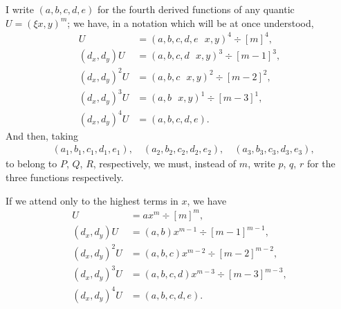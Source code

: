 \documentclass[12pt,a4paper]{article}
\theoremstyle{cayley}
\theoremstyle{definition}
\numberwithin{equation}{section}
\begin{document}
I write $(a, b, c, d, e)$ for the fourth derived functions of any quantic $U = (\xi x, y)^m$; we have, in a notation which will be at once understood,
\begin{align*}
U &= (a, b, c, d, e \,\,\,\, x, y)^4 \div [m]^4, \\
(d_x, d_y)U &= (a, b, c, d \,\,\,\, x, y)^3 \div [m-1]^3, \\
(d_x, d_y)^2 U &= (a, b, c \,\,\,\, x, y)^2 \div [m-2]^2, \\
(d_x, d_y)^3 U &= (a, b \,\,\,\, x, y)^1 \div [m-3]^1, \\
(d_x, d_y)^4 U &= (a, b, c, d, e).
\end{align*}
And then, taking
\begin{align*}
&(a_1, b_1, c_1, d_1, e_1), \quad (a_2, b_2, c_2, d_2, e_2), \quad (a_3, b_3, c_3, d_3, e_3),
\end{align*}
to belong to $P$, $Q$, $R$, respectively, we must, instead of $m$, write $p$, $q$, $r$ for the three functions respectively.

If we attend only to the highest terms in $x$, we have
\begin{align*}
U &= ax^m \div [m]^m, \\
(d_x, d_y)U &= (a, b)x^{m-1} \div [m-1]^{m-1}, \\
(d_x, d_y)^2 U &= (a, b, c)x^{m-2} \div [m-2]^{m-2}, \\
(d_x, d_y)^3 U &= (a, b, c, d)x^{m-3} \div [m-3]^{m-3}, \\
(d_x, d_y)^4 U &= (a, b, c, d, e).
\end{align*}
\end{document}
